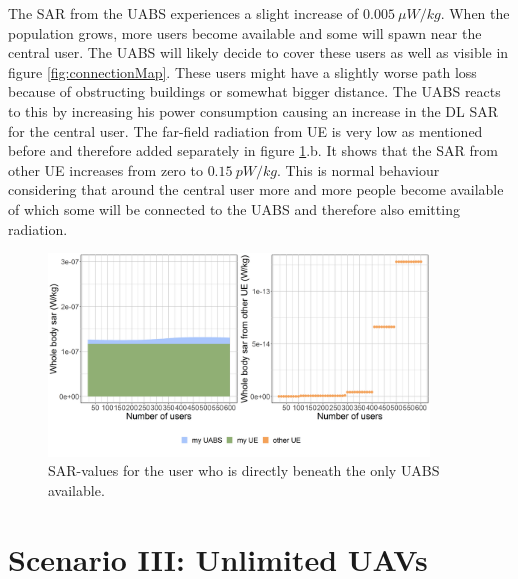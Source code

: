 The \gls{SAR} from the \gls{UABS} experiences a slight increase of $0.005\ \mu W/kg$. When the population grows, more users become available 
and some will spawn near the central user. The \gls{UABS} will likely decide to cover these users as well as visible in figure \ref{fig:connectionMap}.
These users might have a slightly 
worse path loss because of obstructing buildings or somewhat bigger distance. The \gls{UABS} reacts to this by increasing 
his power consumption causing an increase in the \gls{DL} \gls{SAR} for the central user.
The far-field radiation from \gls{UE} is very low as mentioned before and therefore added separately in figure \ref{fig:uvsulsarcentralUsers}.b.
It shows that the \gls{SAR}  from other \gls{UE} increases from zero to $0.15\ pW/kg$. This is normal 
behaviour considering that around the central user more and more people become available of which some will be connected to the \gls{UABS}
and therefore also emitting radiation.
\begin{figure}[hb]
\centering
  \includegraphics[width=0.9\textwidth]{../results/s2/uvsulsarcentralUser.png}
  \caption{SAR-values for the user who is directly beneath the only \acs{UABS} available.}
  \label{fig:uvsulsarcentralUsers}
\end{figure}

\FloatBarrier
\section{Scenario III: Unlimited \gls{UAV}s}
\label{s3}


